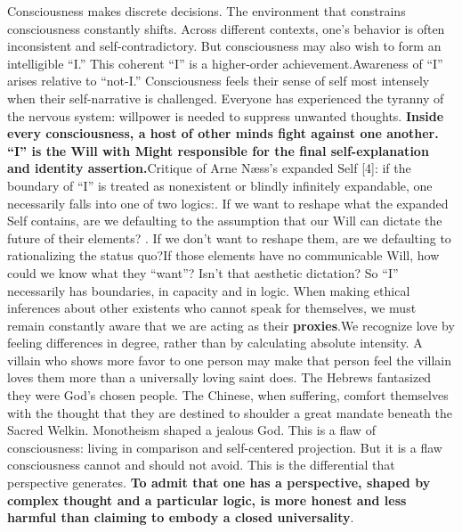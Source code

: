 \documentclass[11pt]{article}
\renewcommand{\\}[1][\mynewlineskip]{\oldnewline[#1]}
\begin{document}
\vspace{1em}
Consciousness makes discrete decisions. The environment that constrains consciousness constantly shifts. Across different contexts, one's behavior is often inconsistent and self-contradictory. But consciousness may also wish to form an intelligible ``I.'' This coherent ``I'' is a higher-order achievement.\\
Awareness of ``I'' arises relative to ``not-I.'' Consciousness feels their sense of self most intensely when their self-narrative is challenged. \\
Everyone has experienced the tyranny of the nervous system: willpower is needed to suppress unwanted thoughts. \textbf{Inside every consciousness, a host of other minds fight against one another. ``I'' is the Will with Might responsible for the final self-explanation and identity assertion.}\\
Critique of Arne N\ae ss's expanded Self [4]: if the boundary of ``I'' is treated as nonexistent or blindly infinitely expandable, one necessarily falls into one of two logics:\\
1. If we want to reshape what the expanded Self contains, are we defaulting to the assumption that our Will can dictate the future of their elements? \\
2. If we don't want to reshape them, are we defaulting to rationalizing the status quo?\\
If those elements have no communicable Will, how could we know what they ``want''? Isn't that aesthetic dictation? So ``I'' necessarily has boundaries, in capacity and in logic. When making ethical inferences about other existents who cannot speak for themselves, we must remain constantly aware that we are acting as their \textbf{proxies}.\\
We recognize love by feeling differences in degree, rather than by calculating absolute intensity.  A villain who shows more favor to one person may make that person feel the villain loves them more than a universally loving saint does. The Hebrews fantasized they were God's chosen people. The Chinese, when suffering, comfort themselves with the thought that they are destined to shoulder a great mandate beneath the Sacred Welkin. Monotheism shaped a jealous God. This is a flaw of consciousness: living in comparison and self-centered projection. But it is a flaw consciousness cannot and should not avoid. This is the differential that perspective generates. \textbf{To admit that one has a perspective, shaped by complex thought and a particular logic, is more honest and less harmful than claiming to embody a closed universality}.
\end{document}
